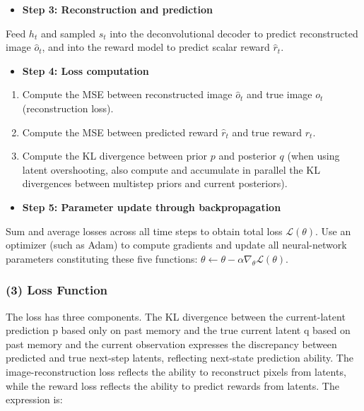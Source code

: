 \begin{itemize}
\tightlist
\item
  \textbf{Step 3: Reconstruction and prediction}
\end{itemize}

Feed \(h_t\) and sampled \(s_t\) into the deconvolutional decoder to predict reconstructed image \(\hat{o}_t\), and into the reward model to predict scalar reward \(\hat{r}_t\).

\begin{itemize}
\tightlist
\item
  \textbf{Step 4: Loss computation}
\end{itemize}

\begin{enumerate}
\def\labelenumi{\arabic{enumi}.}
\tightlist
\item
  Compute the MSE between reconstructed image \(\hat{o}_t\) and true image \(o_t\) (reconstruction loss).
\item
  Compute the MSE between predicted reward \(\hat{r}_t\) and true reward \(r_t\).
\item
  Compute the KL divergence between prior \(p\) and posterior \(q\) (when using latent overshooting, also compute and accumulate in parallel the KL divergences between multistep priors and current posteriors).
\end{enumerate}

\begin{itemize}
\tightlist
\item
  \textbf{Step 5: Parameter update through backpropagation}
\end{itemize}

Sum and average losses across all time steps to obtain total loss \(\mathcal{L}(\theta)\). Use an optimizer (such as Adam) to compute gradients and update all neural-network parameters constituting these five functions: \(\theta \leftarrow \theta - \alpha \nabla_{\theta}\mathcal{L}(\theta)\).

\hypertarget{loss-function-1}{%
\subsubsection{(3) Loss Function}\label{loss-function-1}}

The loss has three components. The KL divergence between the current-latent prediction p based only on past memory and the true current latent q based on past memory and the current observation expresses the discrepancy between predicted and true next-step latents, reflecting next-state prediction ability. The image-reconstruction loss reflects the ability to reconstruct pixels from latents, while the reward loss reflects the ability to predict rewards from latents. The expression is:

